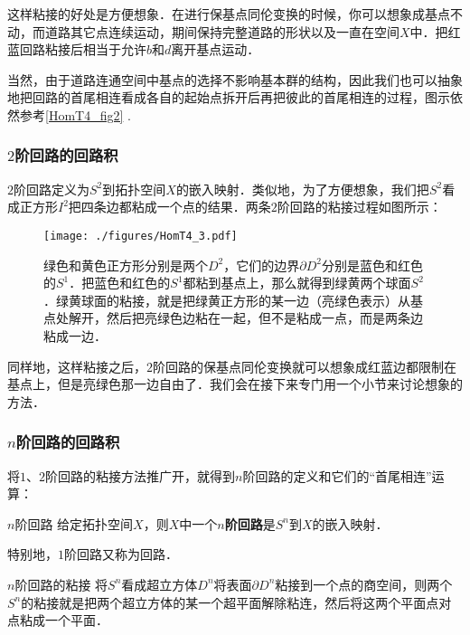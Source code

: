 这样粘接的好处是方便想象．在进行保基点同伦变换的时候，你可以想象成基点不动，而道路其它点连续运动，期间保持完整道路的形状以及一直在空间$X$中．把红蓝回路粘接后相当于允许$b$和$d$离开基点运动．

当然，由于道路连通空间中基点的选择不影响基本群的结构，因此我们也可以抽象地把回路的首尾相连看成各自的起始点拆开后再把彼此的首尾相连的过程，图示依然参考\autoref{HomT4_fig2} .

\subsubsection{$2$阶回路的回路积}

$2$阶回路定义为$S^2$到拓扑空间$X$的嵌入映射．类似地，为了方便想象，我们把$S^2$看成正方形$I^2$把四条边都粘成一个点的结果．两条$2$阶回路的粘接过程如图所示：

\begin{figure}[ht]
\centering
\texttt{[image: ./figures/HomT4\_3.pdf]}
\caption{绿色和黄色正方形分别是两个$D^2$，它们的边界$\partial D^2$分别是蓝色和红色的$S^1$．把蓝色和红色的$S^1$都粘到基点上，那么就得到绿黄两个球面$S^2$．绿黄球面的粘接，就是把绿黄正方形的某一边（亮绿色表示）从基点处解开，然后把亮绿色边粘在一起，但不是粘成一点，而是两条边粘成一边．} \label{HomT4_fig3}
\end{figure}

同样地，这样粘接之后，$2$阶回路的保基点同伦变换就可以想象成红蓝边都限制在基点上，但是亮绿色那一边自由了．我们会在接下来专门用一个小节来讨论想象的方法．%

\subsubsection{$n$阶回路的回路积}

将$1$、$2$阶回路的粘接方法推广开，就得到$n$阶回路的定义和它们的“首尾相连”运算：

\begin{definition}{$n$阶回路}
给定拓扑空间$X$，则$X$中一个$n$\textbf{阶回路}是$S^n$到$X$的嵌入映射．
\end{definition}

特别地，$1$阶回路又称为回路．

\begin{definition}{$n$阶回路的粘接}
将$S^n$看成超立方体$D^n$将表面$\partial D^n$粘接到一个点的商空间，则两个$S^n$的粘接就是把两个超立方体的某一个超平面解除粘连，然后将这两个平面点对点粘成一个平面．
\end{definition}

